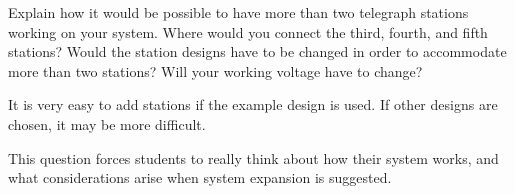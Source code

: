 

Explain how it would be possible to have more than two telegraph stations working on your system.  Where would you connect the third, fourth, and fifth stations?  Would the station designs have to be changed in order to accommodate more than two stations?  Will your working voltage have to change?







It is very easy to add stations if the example design is used.  If other designs are chosen, it may be more difficult.







This question forces students to really think about how their system works, and what considerations arise when system expansion is suggested.



